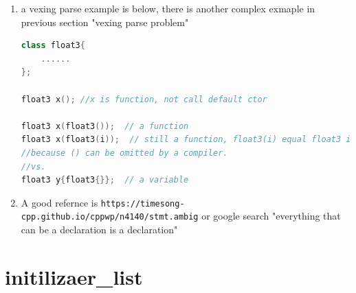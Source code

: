 \documentclass[a4paper,11pt,twoside]{book}
\begin{document}
\begin{enumerate}
	\item a vexing parse example is below, there is another complex exmaple in previous section "vexing parse problem"
\begin{lstlisting}[frame=single, language=c++]
class float3{
	......
};
	
float3 x(); //x is function, not call default ctor
	
float3 x(float3());  // a function
float3 x(float3(i));  // still a function, float3(i) equal float3 i;
//because () can be omitted by a compiler. 
//vs.
float3 y{float3{}};  // a variable
\end{lstlisting}
	
	\item A good refernce is \verb|https://timesong-cpp.github.io/cppwp/n4140/stmt.ambig| or google search 
	"everything that can be a declaration is a declaration" 
\end{enumerate}


\section{initilizaer\_list}
\end{document}
